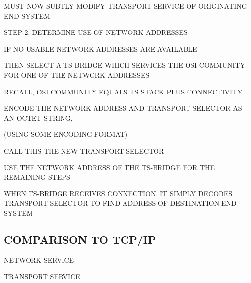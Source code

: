 \begin{bwslide}

\begin{nrtc}
\item	MUST NOW SUBTLY MODIFY TRANSPORT SERVICE OF ORIGINATING END-SYSTEM
    \begin{nrtc}
    \item	STEP 2: DETERMINE USE OF NETWORK ADDRESSES
    \end{nrtc}

\item	IF NO USABLE NETWORK ADDRESSES ARE AVAILABLE

\item	THEN SELECT A TS-BRIDGE WHICH SERVICES THE OSI COMMUNITY FOR ONE OF
	THE NETWORK ADDRESSES
    \begin{nrtc}
    \item	 RECALL, OSI COMMUNITY EQUALS TS-STACK PLUS CONNECTIVITY
    \end{nrtc}
\end{nrtc}
\end{bwslide}


\begin{bwslide}

\begin{nrtc}
\item	ENCODE THE NETWORK ADDRESS AND TRANSPORT SELECTOR AS AN OCTET STRING,
    \begin{nrtc}
    \item	(USING SOME ENCODING FORMAT)
    \end{nrtc}
	CALL THIS THE NEW TRANSPORT SELECTOR

\item	USE THE NETWORK ADDRESS OF THE TS-BRIDGE FOR THE REMAINING STEPS

\item	WHEN TS-BRIDGE RECEIVES CONNECTION,
	IT SIMPLY DECODES TRANSPORT SELECTOR TO FIND ADDRESS OF
	DESTINATION END-SYSTEM
\end{nrtc}
\end{bwslide}




\begin{bwslide}
\part	{COMPARISON TO TCP/IP}\bf

\begin{nrtc}
\item	NETWORK SERVICE

\item	TRANSPORT SERVICE
\end{nrtc}
\end{bwslide}


